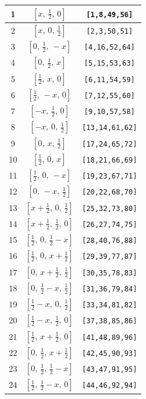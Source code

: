 \documentclass[fleqn,8pt]{jsarticle}
\begin{document}
\begin{longtable}{ccc}
1 & $\left[ x,\, \frac{1}{2},\, 0 \right]$ & {\tt [1,8,49,56]} \\ \hline
2 & $\left[ x,\, 0,\, \frac{1}{2} \right]$ & {\tt [2,3,50,51]} \\ \hline
3 & $\left[ 0,\, \frac{1}{2},\, - x \right]$ & {\tt [4,16,52,64]} \\ \hline
4 & $\left[ 0,\, \frac{1}{2},\, x \right]$ & {\tt [5,15,53,63]} \\ \hline
5 & $\left[ \frac{1}{2},\, x,\, 0 \right]$ & {\tt [6,11,54,59]} \\ \hline
6 & $\left[ \frac{1}{2},\, - x,\, 0 \right]$ & {\tt [7,12,55,60]} \\ \hline
7 & $\left[ - x,\, \frac{1}{2},\, 0 \right]$ & {\tt [9,10,57,58]} \\ \hline
8 & $\left[ - x,\, 0,\, \frac{1}{2} \right]$ & {\tt [13,14,61,62]} \\ \hline
9 & $\left[ 0,\, x,\, \frac{1}{2} \right]$ & {\tt [17,24,65,72]} \\ \hline
10 & $\left[ \frac{1}{2},\, 0,\, x \right]$ & {\tt [18,21,66,69]} \\ \hline
11 & $\left[ \frac{1}{2},\, 0,\, - x \right]$ & {\tt [19,23,67,71]} \\ \hline
12 & $\left[ 0,\, - x,\, \frac{1}{2} \right]$ & {\tt [20,22,68,70]} \\ \hline
13 & $\left[ x + \frac{1}{2},\, 0,\, \frac{1}{2} \right]$ & {\tt [25,32,73,80]} \\ \hline
14 & $\left[ x + \frac{1}{2},\, \frac{1}{2},\, 0 \right]$ & {\tt [26,27,74,75]} \\ \hline
15 & $\left[ \frac{1}{2},\, 0,\, \frac{1}{2} - x \right]$ & {\tt [28,40,76,88]} \\ \hline
16 & $\left[ \frac{1}{2},\, 0,\, x + \frac{1}{2} \right]$ & {\tt [29,39,77,87]} \\ \hline
17 & $\left[ 0,\, x + \frac{1}{2},\, \frac{1}{2} \right]$ & {\tt [30,35,78,83]} \\ \hline
18 & $\left[ 0,\, \frac{1}{2} - x,\, \frac{1}{2} \right]$ & {\tt [31,36,79,84]} \\ \hline
19 & $\left[ \frac{1}{2} - x,\, 0,\, \frac{1}{2} \right]$ & {\tt [33,34,81,82]} \\ \hline
20 & $\left[ \frac{1}{2} - x,\, \frac{1}{2},\, 0 \right]$ & {\tt [37,38,85,86]} \\ \hline
21 & $\left[ \frac{1}{2},\, x + \frac{1}{2},\, 0 \right]$ & {\tt [41,48,89,96]} \\ \hline
22 & $\left[ 0,\, \frac{1}{2},\, x + \frac{1}{2} \right]$ & {\tt [42,45,90,93]} \\ \hline
23 & $\left[ 0,\, \frac{1}{2},\, \frac{1}{2} - x \right]$ & {\tt [43,47,91,95]} \\ \hline
24 & $\left[ \frac{1}{2},\, \frac{1}{2} - x,\, 0 \right]$ & {\tt [44,46,92,94]} \\
\end{longtable}
\end{document}
